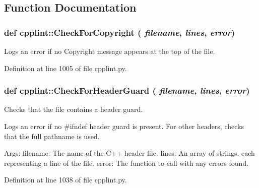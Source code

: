 \subsection{Function Documentation}
\hypertarget{namespacecpplint_ac9cdecc582bc833c2eb7ac6eed6d2624}{
\subsubsection[{CheckForCopyright}]{\setlength{\rightskip}{0pt plus 5cm}def cpplint::CheckForCopyright ( {\em filename}, \/   {\em lines}, \/   {\em error})}}
\label{namespacecpplint_ac9cdecc582bc833c2eb7ac6eed6d2624}
\begin{DoxyVerb}Logs an error if no Copyright message appears at the top of the file.\end{DoxyVerb}
 

Definition at line 1005 of file cpplint.py.

\hypertarget{namespacecpplint_a6ecd551d11dde0a916ef4a6317b70585}{
\subsubsection[{CheckForHeaderGuard}]{\setlength{\rightskip}{0pt plus 5cm}def cpplint::CheckForHeaderGuard ( {\em filename}, \/   {\em lines}, \/   {\em error})}}
\label{namespacecpplint_a6ecd551d11dde0a916ef4a6317b70585}
\begin{DoxyVerb}Checks that the file contains a header guard.

Logs an error if no #ifndef header guard is present.  For other
headers, checks that the full pathname is used.

Args:
  filename: The name of the C++ header file.
  lines: An array of strings, each representing a line of the file.
  error: The function to call with any errors found.
\end{DoxyVerb}
 

Definition at line 1038 of file cpplint.py.


